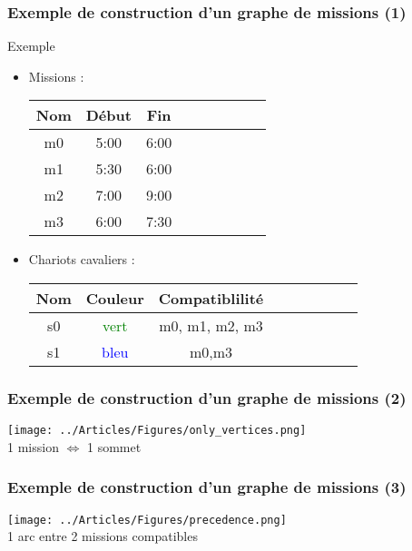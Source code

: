 \documentclass{beamer}
\begin{document}
\begin{frame}
 \frametitle{Exemple de construction d'un graphe de missions (1)}
	\begin{exampleblock}{Exemple}
		\begin{itemize}
		 \item Missions : \\
		\begin{center}
			\begin{tabular}{*{3}{|c|c|c}}
	 	 		\hline
		 		Nom	&	Début	&	Fin\\
				\hline
				m0	&	5:00	&	6:00 \\
				m1	&	5:30	&	6:00 \\
				m2	&	7:00	&	9:00 \\
				m3	&	6:00	&	7:30 \\
				\hline
	 		\end{tabular}
		\end{center}
		\item Chariots cavaliers : \\
		\begin{center}
			\begin{tabular}{*{3}{|c|c|c}}
	 	 		\hline
		 		Nom	&	Couleur	& Compatiblilité\\
				\hline
				s0	&	\textcolor{green}{vert}	& m0, m1, m2, m3\\
				s1	&	\textcolor{blue}{bleu}	& m0,m3\\	
				\hline
	 		\end{tabular}
		\end{center}
		
		\end{itemize}

	\end{exampleblock}
	

	
\end{frame}
\begin{frame}
	\frametitle{Exemple de construction d'un graphe de missions (2)}
	\begin{center}
		\texttt{[image: ../Articles/Figures/only\_vertices.png]} \\
	
		1 mission $\Longleftrightarrow$ 1 sommet
	\end{center}
	
\end{frame}
\begin{frame}
	\frametitle{Exemple de construction d'un graphe de missions (3)}
 	\begin{center}
 		\texttt{[image: ../Articles/Figures/precedence.png]} \\

		1 arc entre 2 missions compatibles
	\end{center}
\end{frame}
\end{document}
